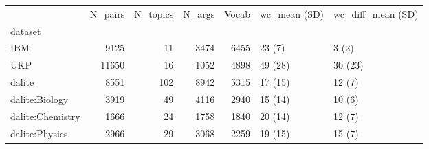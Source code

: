 \begin{tabular}{lrrrrll}
\toprule
{} &  N\_pairs &  N\_topics &  N\_args &  Vocab & wc\_mean (SD) & wc\_diff\_mean (SD) \\
dataset          &          &           &         &        &              &                   \\
\midrule
IBM              &     9125 &        11 &    3474 &   6455 &       23 (7) &             3 (2) \\
UKP              &    11650 &        16 &    1052 &   4898 &      49 (28) &           30 (23) \\
dalite           &     8551 &       102 &    8942 &   5315 &      17 (15) &            12 (7) \\
dalite:Biology   &     3919 &        49 &    4116 &   2940 &      15 (14) &            10 (6) \\
dalite:Chemistry &     1666 &        24 &    1758 &   1840 &      20 (14) &            12 (7) \\
dalite:Physics   &     2966 &        29 &    3068 &   2259 &      19 (15) &            15 (7) \\
\bottomrule
\end{tabular}

